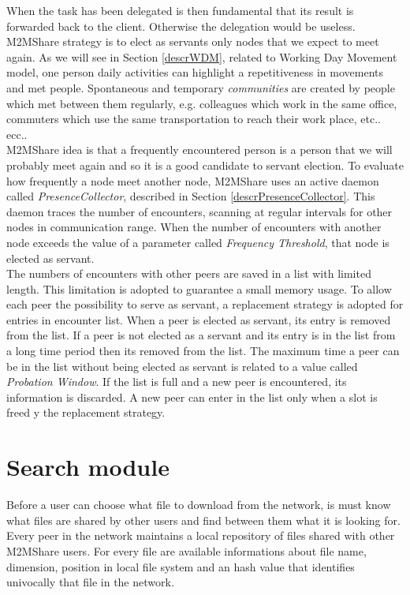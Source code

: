 When the task has been delegated is then fundamental that its result is forwarded back to the client. Otherwise the delegation would be useless. M2MShare strategy is to elect as servants only nodes that we expect to meet again. As we will see in Section \ref{descrWDM}, related to Working Day Movement model, one person daily activities can highlight a repetitiveness in movements and met people. Spontaneous and temporary \textit{communities} are created by people which met between them regularly, e.g. colleagues which work in the same office, commuters which use the same transportation to reach their work place, etc.. ecc..
\\

M2MShare idea is that a frequently encountered person is a person that we will probably meet again and so it is a good candidate to servant election. To evaluate how frequently a node meet another node, M2MShare uses an active daemon called \textit{PresenceCollector}, described in Section \ref{descrPresenceCollector}. This daemon traces the number of encounters, scanning at regular intervals for other nodes in communication range. When the number of encounters with another node exceeds the value of a parameter called \textit{Frequency Threshold}, that node is elected as servant.
\\

The numbers of encounters with other peers are saved in a list with limited length. This limitation is adopted to guarantee a small memory usage. To allow each peer the possibility to serve as servant, a replacement strategy is adopted for entries in encounter list. When a peer is elected as servant, its entry is removed from the list. If a peer is not elected as a servant and its entry is in the list from a long time period then its removed from the list. The maximum time a peer can be in the list without being elected as servant is related to a value called \textit{Probation Window}. If the list is full and a new peer is encountered, its information is discarded. A new peer can enter in the list only when a slot is freed y the replacement strategy.

\section{Search module}
Before a user can choose what file to download from the network, is must know what files are shared by other users and find between them what it is looking for. Every peer in the network maintains a local repository of files shared with other M2MShare users. For every file are available informations about file name, dimension, position in local file system and an hash value that identifies univocally that file in the network.
\\

